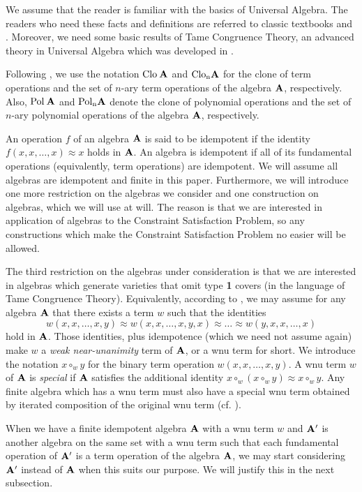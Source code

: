 \documentclass[11pt]{amsart}
\newcommand{\m}[1]{{\uppercase {\mathbf {#1}}}}
\newcommand{\clo}[1]{{\rm Clo\:\m #1}}
\newcommand{\clon}[2]{{\rm Clo_{#1}\m #2}}
\newcommand{\pol}[1]{{\rm Pol\:\m #1}}
\newcommand{\poln}[2]{{\rm Pol_{#1}\m #2}}
\theoremstyle{definition}
\begin{document}
We assume that the reader is familiar with the basics of Universal Algebra. The readers who need these facts and definitions are referred to classic textbooks \cite{burris-sank} and \cite{alvin}. Moreover, we need some basic results of Tame Congruence Theory, an advanced theory in Universal Algebra which was developed in \cite{tct}.

Following \cite{alvin}, we use the notation $\clo a$ and $\clon{n}{a}$ for the clone of term operations and the set of $n$-ary term operations of the algebra $\m a$, respectively. Also, $\pol a$ and $\poln{n}{a}$ denote the clone of polynomial operations and the set of $n$-ary polynomial operations of the algebra $\m a$, respectively.

An operation $f$ of an algebra $\m a$ is said to be idempotent if the identity $f(x,x,\ldots,x)\approx x$ holds in $\m a$. An algebra is idempotent if all of its fundamental operations (equivalently, term operations) are idempotent. We will assume all algebras are idempotent and finite in this paper. Furthermore, we will introduce one more restriction on the algebras we consider and one construction on algebras, which we will use at will. The reason is that we are interested in application of algebras to the Constraint Satisfaction Problem, so any constructions which make the Constraint Satisfaction Problem no easier will be allowed.

The third restriction on the algebras under consideration is that we are interested in algebras which generate varieties that omit type {\bf 1} covers (in the language of Tame Congruence Theory). Equivalently, according to \cite{MM}, we may assume for any algebra $\m a$ that there exists a term $w$ such that the identities
$$w(x,x,\ldots,x,y)\approx w(x,x,\ldots,x,y,x)\approx \ldots \approx w(y,x,x,\ldots,x)$$
hold in $\m a$. Those identities, plus idempotence (which we need not assume again) make $w$ a {\em weak near-unanimity} term of $\m a$, or a wnu term for short. We introduce the notation $x\circ_w y$ for the binary term operation $w(x,x,\ldots,x,y)$. A wnu term $w$ of $\m a$ is {\em special} if $\m a$ satisfies the additional identity $x\circ_w(x\circ_w y)\approx x\circ_w y$. Any finite algebra which has a wnu term must also have a special wnu term obtained by iterated composition of the original wnu term (cf. \cite[Lemma 4.7]{MM}).

When we have a finite idempotent algebra $\m a$ with a wnu term $w$ and $\m a'$ is another algebra on the same set with a wnu term such that each fundamental operation of $\m a'$ is a term operation of the algebra $\m a$, we may start considering $\m a'$ instead of $\m a$ when this suits our purpose. We will justify this in the next subsection.
\end{document}
